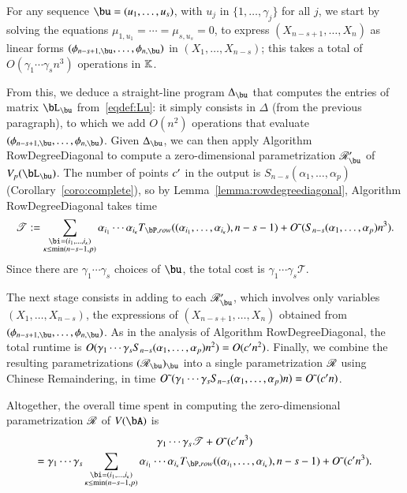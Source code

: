 \documentclass[amsthm]{elsart}
\begin{document}
For any sequence $\bu=(u_1,\dots,u_s)$, with $u_j$ in
$\{1,\dots,\gamma_j\}$ for all $j$, we start by solving the equations
$\mu_{1,u_1} = \cdots = \mu_{s,u_s}=0$, to express
$(X_{n-s+1},\dots,X_n)$ as linear forms
$(\phi_{n-s+1,\bu},\dots,\phi_{n,\bu})$ in $(X_1,\dots,X_{n-s})$; this
takes a total of $O(\gamma_1 \cdots \gamma_s n^3 )$ operations in
$\mathbb{K}$.

From this, we deduce a straight-line program $\Delta_\bu$ that
computes the entries of matrix $\bL_\bu$ from~\eqref{eqdef:Lu}: it
simply consists in $\Delta$ (from the previous paragraph), to which we
add $O(n^2)$ operations that evaluate
$(\phi_{n-s+1,\bu},\dots,\phi_{n,\bu})$. Given $\Delta_\bu$, we can
then apply Algorithm {\sf RowDegreeDiagonal} to compute a
zero-dimensional parametrization $\scrR'_\bu$ of $V_p(\bL_\bu)$.  The
number of points ${c'}{}$ in the output is
$S_{n-s}(\alpha_1,\dots,\alpha_p)$ (Corollary~\ref{coro:complete}), so
by Lemma~\ref{lemma:rowdegreediagonal}, Algorithm {\sf
  RowDegreeDiagonal} takes time
\begin{eqnarray}
\mathscr{T}:=\sum_{\substack{\bi=(i_1,\dots,i_\kappa)\\ \kappa\le\min(n-s-1,p)}}
\alpha_{i_1} \cdots \alpha_{i_\kappa} T_{\bP,{\rm row}}((\alpha_{i_1},\dots,\alpha_{i_\kappa}), n-s-1)
+
\softO( S_{n-s}(\alpha_1,\dots,\alpha_p) n^3).  \label{eqdef:T}
\end{eqnarray}
Since there are $\gamma_1 \cdots \gamma_s$ choices of $\bu$, 
the total cost is $\gamma_1 \cdots \gamma_s \mathscr{T}$.


The next stage consists in adding to each $\scrR'_\bu$, which involves
only variables $(X_1,\dots,X_{n-s})$, the expressions of
$(X_{n-s+1},\dots,X_n)$ obtained from
$(\phi_{n-s+1,\bu},\dots,\phi_{n,\bu})$. As in the analysis of
Algorithm {\sf RowDegreeDiagonal}, the total runtime is $O(\gamma_1
\cdots \gamma_s S_{n-s}(\alpha_1,\dots,\alpha_p)  n^2)=O({c'}{} n^2)$. Finally, we
combine the resulting parametrizations $(\scrR_\bu)_\bu$ into a single
parametrization $\mathscr{R}$ using Chinese Remaindering, in time
${O}{\,\tilde{ }\,}(\gamma_1 \cdots \gamma_s  S_{n-s}(\alpha_1,\dots,\alpha_p) n)={O}{\,\tilde{ }\,}({c'}{} n)$.

Altogether, the overall time spent in computing the zero-dimensional
parametrization $\mathscr{R}$ of $V(\bA)$ is 
\begin{multline}\label{eq:VbA}
\gamma_1 \cdots \gamma_s \mathscr{T} +\softO( \rc n^3)  \\  = \gamma_1 \cdots \gamma_s\sum_{\substack{\bi=(i_1,\dots,i_\kappa)\\ \kappa\le\min(n-s-1,p)}}
\alpha_{i_1} \cdots \alpha_{i_\kappa} T_{\bP,{\rm row}}((\alpha_{i_1},\dots,\alpha_{i_\kappa}), n-s-1)
+\softO( \rc n^3).
\end{multline}
\end{document}
